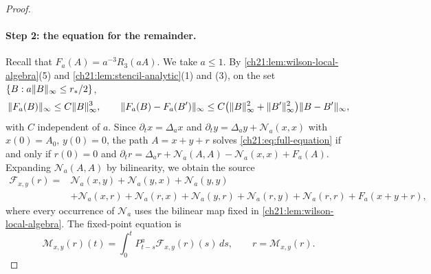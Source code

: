 \begin{proof}
\paragraph{Step 2: the equation for the remainder.}
Recall that $F_a(A)=a^{-3}R_3(aA)$. We take $a\le1$. By \cref{ch21:lem:wilson-local-algebra}(5) and \cref{ch21:lem:stencil-analytic}(1) and (3), on the set $\{B:a\lVert B\rVert_\infty\le r_*/2\}$,
\begin{equation}\label{ch21:eq:cubic-physical-bounds}
 \lVert F_a(B)\rVert_\infty\le C\lVert B\rVert_\infty^3,\qquad
 \lVert F_a(B)-F_a(B')\rVert_\infty\le C\bigl(\lVert B\rVert_\infty^2+\lVert B'\rVert_\infty^2\bigr)\lVert B-B'\rVert_\infty,
\end{equation}
with $C$ independent of $a$. Since $\partial_tx=\Delta_ax$ and $\partial_ty=\Delta_ay+\mathcal N_a(x,x)$ with $x(0)=A_0$, $y(0)=0$, the path $A=x+y+r$ solves \eqref{ch21:eq:full-equation} if and only if $r(0)=0$ and $\partial_tr=\Delta_ar+\mathcal N_a(A,A)-\mathcal N_a(x,x)+F_a(A)$. Expanding $\mathcal N_a(A,A)$ by bilinearity, we obtain the source
\begin{equation}\label{ch21:eq:remainder-source}
 \begin{split}
 \mathscr F_{x,y}(r)={}&\mathcal N_a(x,y)+\mathcal N_a(y,x)+\mathcal N_a(y,y)\\
 &+\mathcal N_a(x,r)+\mathcal N_a(r,x)+\mathcal N_a(y,r)+\mathcal N_a(r,y)+\mathcal N_a(r,r)+F_a(x+y+r),
 \end{split}
\end{equation}
where every occurrence of $\mathcal N_a$ uses the bilinear map fixed in \cref{ch21:lem:wilson-local-algebra}. The fixed-point equation is
\begin{equation}\label{ch21:eq:remainder-map}
 \mathscr M_{x,y}(r)(t)=\int_0^tP^a_{t-s}\mathscr F_{x,y}(r)(s)\,ds,\qquad r=\mathscr M_{x,y}(r).
\end{equation}


\end{proof}
